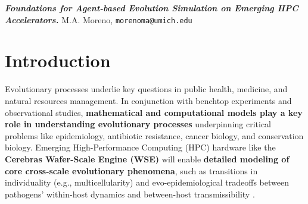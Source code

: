 

\noindent
\textit{\textbf{Foundations for Agent-based Evolution Simulation on Emerging HPC Accelerators.}}
\hfill
{\scriptsize M.A. Moreno, \texttt{morenoma@umich.edu}}

\section{Introduction}
Evolutionary processes underlie key questions in public health, medicine, and natural resources management.
In conjunction with benchtop experiments and observational studies, \textbf{mathematical and computational models play a key role in understanding evolutionary processes} underpinning critical problems like epidemiology, antibiotic resistance, cancer biology, and conservation biology.
Emerging High-Performance Computing (HPC) hardware like the \textbf{Cerebras Wafer-Scale Engine (WSE)} will enable \textbf{detailed modeling of core cross-scale evolutionary phenomena}, such as transitions in individuality (e.g., multicellularity) and evo-epidemiological tradeoffs between pathogens' within-host dynamics and between-host transmissibility \cite{goldsby2020major,schreiber2021evolutionary}.

